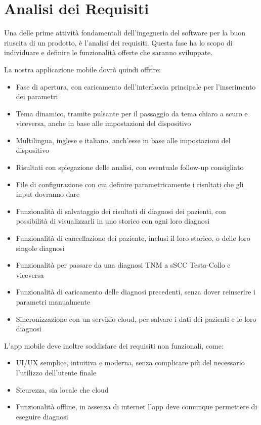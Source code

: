 
\chapter{Analisi dei Requisiti}\label{ch:analisi-dei-requisiti}

Una delle prime attività fondamentali dell'ingegneria del software per la buon riuscita di un prodotto, è l'analisi dei requisiti.
Questa fase ha lo scopo di individuare e definire le funzionalità offerte che saranno sviluppate.

La nostra applicazione mobile dovrà quindi offrire:

\begin{itemize}
    \item Fase di apertura, con caricamento dell'interfaccia principale per l'inserimento dei parametri
    \item Tema dinamico, tramite pulsante per il passaggio da tema chiaro a scuro e viceversa, anche in base alle impostazioni del dispositivo
    \item Multilingua, inglese e italiano, anch'esse in base alle impostazioni del dispositivo
    \item Risultati con spiegazione delle analisi, con eventuale follow-up consigliato
    \item File di configurazione con cui definire parametricamente i risultati che gli input dovranno dare
    \item Funzionalità di salvataggio dei risultati di diagnosi dei pazienti, con possibilità di visualizzarli in uno storico con ogni loro diagnosi
    \item Funzionalità di cancellazione dei paziente, inclusi il loro storico, o delle loro singole diagnosi
    \item Funzionalità per passare da una diagnosi TNM a sSCC Testa-Collo e viceversa
    \item Funzionalità di caricamento delle diagnosi precedenti, senza dover reinserire i parametri manualmente
    \item Sincronizzazione con un servizio cloud, per salvare i dati dei pazienti e le loro diagnosi
\end{itemize}

L'app mobile deve inoltre soddisfare dei requisiti non funzionali, come:

\begin{itemize}
    \item UI/UX semplice, intuitiva e moderna, senza complicare più del necessario l'utilizzo dell'utente finale
    \item Sicurezza, sia locale che cloud
    \item Funzionalità offline, in assenza di internet l'app deve comunque permettere di eseguire diagnosi
\end{itemize}
